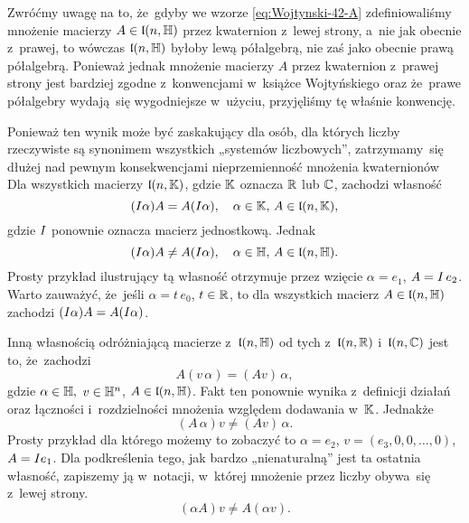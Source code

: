 \documentclass[a4paper,11pt]{article}
\begin{document}
Zwróćmy uwagę na to, że~gdyby we wzorze \eqref{eq:Wojtynski-42-A}
zdefiniowaliśmy mnożenie macierzy $A \in \mathfrak{l}( n, \mathbb{H} )$ przez kwaternion
z~lewej strony, a~nie jak obecnie z~prawej, to wówczas $\mathfrak{l}( n, \mathbb{H} )$ byłoby lewą półalgebrą, nie zaś jako obecnie prawą półalgebrą. Ponieważ jednak mnożenie macierzy $A$ przez kwaternion z~prawej strony jest bardziej zgodne z~konwencjami w~książce Wojtyńskiego oraz że~prawe półalgebry wydają~się wygodniejsze w~użyciu, przyjęliśmy tę właśnie konwencję.

Ponieważ ten wynik może być zaskakujący dla osób, dla których liczby
rzeczywiste są synonimem wszystkich „systemów liczbowych”, zatrzymamy~się
dłużej nad pewnym konsekwencjami nieprzemienność mnożenia kwaternionów Dla
wszystkich macierzy $\mathfrak{l}( n, \mathbb{K} )$, gdzie $\mathbb{K}$ oznacza $\mathbb{R}$ lub
$\mathbb{C}$, zachodzi własność
\begin{equation}
  \label{eq:Wojtynski-53}
  ( I \alpha ) A = A ( I \alpha ), \quad
  \alpha \in \mathbb{K}, \, A \in \mathfrak{l}( n, \mathbb{K} ),
\end{equation}
gdzie $I$ ponownie oznacza macierz jednostkową. Jednak
\begin{equation}
  \label{eq:Wojtynski-54}
  ( I \alpha ) A \neq A ( I \alpha ), \quad
  \alpha \in \mathbb{H}, \, A \in \mathfrak{l}( n, \mathbb{H} ).
\end{equation}
Prosty przykład ilustrujący tą własność otrzymuje przez wzięcie
$\alpha = e_{ 1 }$, $A = I \, e_{ 2 }$. Warto zauważyć, że~jeśli
$\alpha = t \, e_{ 0 }$, $t \in \mathbb{R}$, to dla wszystkich macierz
$A \in \mathfrak{l}( n, \mathbb{H} )$ zachodzi $( I \alpha ) A = A ( I \alpha )$.

Inną własnością odróżniającą macierze z~$\mathfrak{l}( n, \mathbb{H} )$ od tych
z~$\mathfrak{l}( n, \mathbb{R} )$ i~$\mathfrak{l}( n, \mathbb{C} )$ jest to,
że~zachodzi
\begin{equation}
  \label{eq:Wojtynski-55}
  A ( v \, \alpha ) = ( A v ) \, \alpha,
\end{equation}
gdzie $\alpha \in \mathbb{H},$ $v \in \mathbb{H}^{ n }$, $A \in \mathfrak{l}( n, \mathbb{H} )$. Fakt ten
ponownie wynika z~definicji działań oraz łączności i~rozdzielności mnożenia
względem dodawania w~$\mathbb{K}$. Jednakże
\begin{equation}
  \label{eq:Wojtynski-56}
  ( A \, \alpha ) v \neq ( A v ) \, \alpha.
\end{equation}
Prosty przykład dla którego możemy to zobaczyć to $\alpha = e_{ 2 }$,
$v = ( e_{ 3 }, 0, 0, \ldots, 0 )$, $A = I e_{ 1 }$. Dla podkreślenia tego,
jak bardzo „nienaturalną” jest ta ostatnia własność, zapiszemy ją
w~notacji, w~której mnożenie przez liczby obywa~się z~lewej strony.
\begin{equation}
  \label{eq:Wojtynski-57}
  ( \alpha A ) v \neq A ( \alpha v ).
\end{equation}
\end{document}
